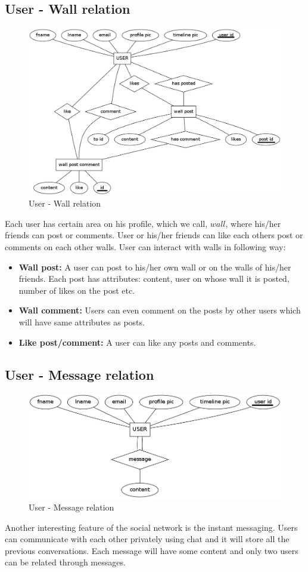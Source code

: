 \documentclass{article}
\begin{document}
\subsection{User - Wall relation}
\begin{figure}[h!]
\centering
\includegraphics[scale=0.4]{user_wall.png}
\caption{User - Wall relation}
\label{fig5}
\end{figure}
Each user has certain area on his profile, which we call, $wall$, where his/her friends can post or comments. User or his/her friends can like each others post or comments on each other walls. User can interact with walls in following way:
\begin{itemize}
\item \textbf{Wall post:} A user can post to his/her own wall or on the walls of his/her friends. Each post has attributes: content, user on whose wall it is posted, number of likes on the post etc.
\item \textbf{Wall comment:} Users can even comment on the posts by other users which will have same attributes as posts.
\item \textbf{Like post/comment:} A user can like any posts and comments. 
\end{itemize}
\subsection{User - Message relation}
\begin{figure}[h!]
\centering
\includegraphics[scale=0.4]{user_messages.png}
\caption{User - Message relation}
\label{fig6}
\end{figure}
Another interesting feature of the social network is the instant messaging. Users can communicate with each other privately using chat and it will store all the previous conversations. Each message will have some content and only two users can be related through messages.
\end{document}
